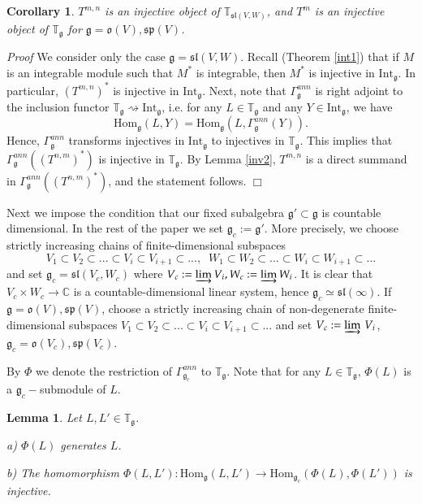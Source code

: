 \documentclass{svmult}
\newtheorem{lem}[theo]{Lemma}
\newtheorem{cor}[theo]{Corollary}
\renewenvironment{proof}{ \emph{Proof}}{$\Box$}
\newcommand {\CC} {\mathbb {C}}
\newcommand{\TT}{\mathbb{T}}
\renewcommand{\sp}{\mathfrak{sp}}
\renewcommand{\sl}{\mathfrak{sl}}
\newcommand{\oo}{\mathfrak{o}}
\renewcommand{\gg}{\mathfrak{g}}
\newcommand{\Int}{\mathrm{Int}}
\newcommand{\Hom}{\mathrm{Hom}}
\begin{document}
\begin{cor}\label{injective} $T^{m,n}$ is an injective object of $\TT_{\sl(V,W)}$, and $T^m$ is an injective object of $\TT_\gg$ for $\gg = \oo(V),\sp(V)$.
\end{cor}

\begin{proof} We consider only the case $\gg = \sl(V,W)$. Recall (Theorem \ref{int1}) that if $M$ is an integrable module such that $M^*$ is integrable, then $M^*$ is injective in $\Int_\gg$. In particular,  $(T^{m,n})^*$ is injective in $\Int_\gg$. Next, note that $\Gamma_\gg^{ann}$ is right adjoint to the inclusion functor $\TT_\gg \rightsquigarrow \Int_\gg$, i.e. for any $L\in\TT_\gg$ and any $Y \in \Int_\gg$, we have $$\Hom_{\gg} (L,Y)=\Hom_{\gg} (L,\Gamma_\gg^{ann}(Y)).$$ Hence, $\Gamma_\gg^{ann}$ transforms injectives in $\Int_\gg$ to injectives in $\TT_\gg$. This implies that $\Gamma_\gg^{ann}((T^{n,m})^*)$ is injective  in $\TT_\gg$. By Lemma \ref{inv2},  $T^{m,n}$ is a direct summand in $\Gamma_\gg^{ann}((T^{n,m})^*)$, and the statement follows.
\end{proof}

Next we impose the condition that our fixed subalgebra $\gg' \subset
\gg$ is countable dimensional. In the rest of the paper we set $\gg_c
:= \gg'$. More precisely, we choose strictly increasing chains of
finite-dimensional subspaces
$$V_1\subset V_2\subset...\subset V_i \subset V_{i+1} \subset ...,
\;\;W_1\subset W_2\subset ... \subset W_i \subset W_{i+1} \subset ...$$ and
set $\gg_c = \sl(V_c,W_c)$ where $V_c := \varinjlim V_i, W_c :=\varinjlim W_i$. 
It is clear that 
$V_c \times W_c \rightarrow \CC$ is a countable-dimensional linear
system, hence $\gg_c \simeq \sl(\infty)$. 
If $\gg = \oo(V),\sp(V)$, choose a strictly increasing chain of
non-degenerate finite-dimensional subspaces 
$V_1 \subset V_2 \subset ... \subset V_i\subset V_{i+1} \subset ... $ and
set 
$V_c:= \varinjlim \, V_i$, $\gg_c = \oo(V_c), \sp(V_c)$. 

By $\Phi$ we denote the restriction of $\Gamma^{ann}_{\gg_c}$ to
$\TT_\gg$. Note that 
for any $L \in \TT_\gg,\,\Phi(L)$ is a $\gg_c-$submodule of $L$.

\begin{lem}\label{propfunctor} Let $L,L'\in\TT_\gg$.

a) $\Phi(L)$ generates $L$.

b) The homomorphism $\Phi(L,L'):\Hom_\gg(L,L')\to\Hom_{\gg_c}(\Phi(L),\Phi(L'))$
is injective.

\end{lem}
\end{document}
